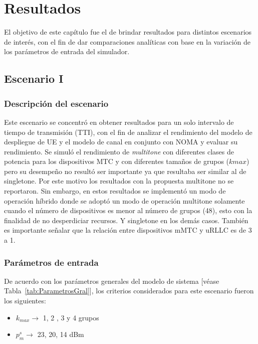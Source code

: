 
\chapter{Resultados} %

\label{Chapter7} %

El objetivo de este capítulo fue el de brindar resultados para distintos escenarios de interés, con el fin de dar comparaciones analíticas con base en la variación de los parámetros de entrada del simulador.


\section{Escenario I} %
\subsection{Descripción del escenario}
Este escenario se concentró en obtener resultados para un solo intervalo de tiempo de transmisión (TTI), con el fin de analizar el rendimiento del modelo de despliegue de UE y el modelo de canal en conjunto con NOMA y evaluar su rendimiento.
Se simuló el rendimiento de \textit{multitone} con diferentes clases de potencia para los dispositivos MTC y con diferentes tamaños de grupos ($kmax$) pero su desempeño no resultó ser importante ya que resultaba ser similar al de singletone. Por este motivo los resultados con la propuesta multitone no se reportaron. Sin embargo, en estos resultados se implementó un modo de operación híbrido donde se adoptó un modo de operación multitone solamente cuando el número de dispositivos es menor al número de grupos (48), esto con la finalidad de no desperdiciar recursos. Y singletone en los demás casos.
También es importante señalar que la relación entre dispositivos mMTC y uRLLC es de 3 a 1.
\subsection{Parámetros de entrada}
De acuerdo con los parámetros generales del modelo de sistema [véase Tabla~\ref{tab:ParametrosGral}], los criterios considerados para este escenario fueron los siguientes:
\begin{itemize} 
	\item $k_{max} \to $ 1, 2 , 3 y 4 grupos
	\item $p_{m}^{s} \to$ 23, 20, 14 dBm
\end{itemize}

